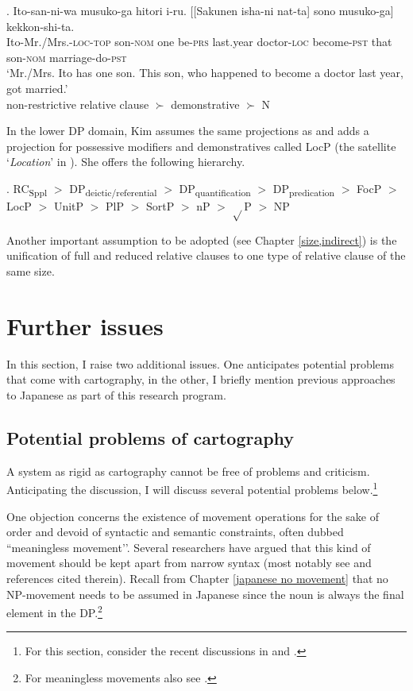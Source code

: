 \documentclass [output=book,colorlinks,citecolor=brown]{langscibook}
\begin{document}
\exg. Ito-san-ni-wa musuko-ga hitori i-ru. [[Sakunen isha-ni nat-ta] sono musuko-ga] kekkon-shi-ta.\\
Ito-Mr./Mrs.-\textsc{loc-top} son-\textsc{nom} one be-\textsc{prs} last.year doctor-\textsc{loc} become-\textsc{pst} that son-\textsc{nom} marriage-do-\textsc{pst}\\
`Mr./Mrs. Ito has one son. This son, who happened to become a doctor last year, got married.' \\ \null \hfill non-restrictive relative clause $\succ$ demonstrative $\succ$ N

In the lower DP domain, Kim assumes the same projections as \citet{svenonius:2008:position} and adds a projection for possessive modifiers and demonstratives called LocP (the satellite `\textit{Location}’ in \citet{rijkhoff:2002:noun}). She offers the following hierarchy. %

\ex. {RC\textsubscript{Sppl}} $>$ DP\textsubscript{deictic/referential} $>$ DP\textsubscript{quantification} $>$ DP\textsubscript{predication} $>$ FocP $>$ LocP $>$ UnitP $>$ PlP $>$ SortP $>$ nP $>$ $\sqrt{}$P $>$ NP \null \hfill \citep[132]{kim:2019:syntax}

Another important assumption to be adopted (see Chapter \ref{size,indirect}) is the unification of full and reduced relative clauses to one type of relative clause of the same size.

\section{Further issues}

In this section, I raise two additional issues. One anticipates potential problems that come with cartography, in the other, I briefly mention previous approaches to Japanese as part of this research program.

\subsection{Potential problems of cartography} \label{problemscarto} %

A system as rigid as cartography cannot be free of problems and criticism. Anticipating the discussion, I will discuss several potential problems below.\footnote{For this section, consider the recent discussions in \citet{manzini:2025:left} and \citet{cinque:2025:superiority}.}

One objection concerns the existence of movement operations for the sake of order and devoid of syntactic and semantic constraints, often dubbed ``meaningless movement’’. Several researchers have argued that this kind of movement should be kept apart from narrow syntax (most notably see \citealt{chomsky:2019:generative} and references cited therein). Recall from Chapter \ref{japanese no movement} that no NP-movement needs to be assumed in Japanese since the noun is always the final element in the DP.\footnote{For meaningless movements also see \citet{hall:2015:spelling}.} %
\end{document}
